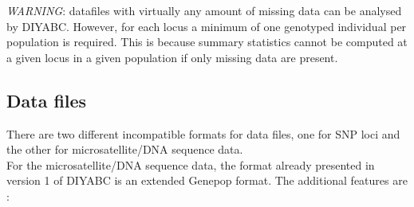 \emph{WARNING}: datafiles with virtually any amount of missing data
can be analysed by DIYABC. However, for each locus a minimum of one
genotyped individual per population is required. This is because summary
statistics cannot be computed at a given locus in a given population
if only missing data are present.


\subsection{Data files}

There are two different incompatible formats for data files, one for
SNP loci and the other for microsatellite/DNA sequence data.\\
 For the microsatellite/DNA sequence data, the format already presented
in version 1 of DIYABC is an extended Genepop format. The additional
features are :
